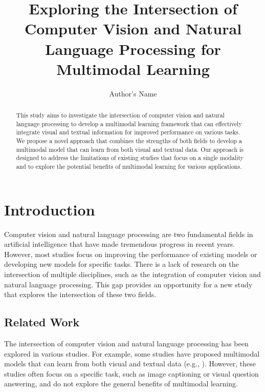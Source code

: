 \documentclass{article}
\begin{document}
\title{Exploring the Intersection of Computer Vision and Natural Language Processing for Multimodal Learning}

\author{Author's Name}

\maketitle

\begin{abstract}
This study aims to investigate the intersection of computer vision and natural language processing to develop a multimodal learning framework that can effectively integrate visual and textual information for improved performance on various tasks. We propose a novel approach that combines the strengths of both fields to develop a multimodal model that can learn from both visual and textual data. Our approach is designed to address the limitations of existing studies that focus on a single modality and to explore the potential benefits of multimodal learning for various applications.
\end{abstract}

\section{Introduction}

Computer vision and natural language processing are two fundamental fields in artificial intelligence that have made tremendous progress in recent years. However, most studies focus on improving the performance of existing models or developing new models for specific tasks. There is a lack of research on the intersection of multiple disciplines, such as the integration of computer vision and natural language processing. This gap provides an opportunity for a new study that explores the intersection of these two fields.

\subsection{Related Work}

The intersection of computer vision and natural language processing has been explored in various studies. For example, some studies have proposed multimodal models that can learn from both visual and textual data (e.g., \cite{lei2026promptprotocolfastcharging, xu2026exploitingdinov3basedselfsupervisedfeatures}). However, these studies often focus on a specific task, such as image captioning or visual question answering, and do not explore the general benefits of multimodal learning.
\end{document}
